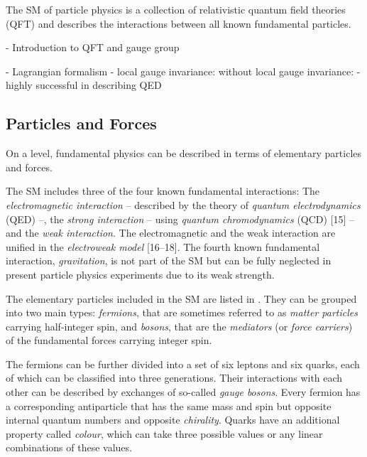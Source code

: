 

The SM of particle physics is a collection of relativistic quantum field theories (QFT) and describes the interactions between all known fundamental particles. 

- Introduction to QFT and gauge group

- Lagrangian formalism
- local gauge invariance: without local gauge invariance:
- highly successful in describing QED

\subsection{Particles and Forces}
\label{sec:particle-content}
On a  level, fundamental physics can be described in terms of elementary particles and forces. 

The SM includes three of the four known fundamental interactions: The \emph{electromagnetic interaction} -- described by the theory of \emph{quantum electrodynamics} (QED) --, the \emph{strong interaction} -- using \emph{quantum chromodynamics} (QCD) [15] -- and the \emph{weak interaction}. The electromagnetic and the weak interaction are unified in the \emph{electroweak model} [16–18]. The fourth known fundamental interaction, \emph{gravitation}, is not part of the SM but can be fully neglected in present particle physics experiments due to its weak strength.

The elementary particles included in the SM are listed in . They can be grouped into two main types: \emph{fermions}, that are sometimes referred to as \emph{matter particles} carrying half-integer spin, and \emph{bosons}, that are the \emph{mediators} (or \emph{force carriers}) of the fundamental forces carrying integer spin. 

The fermions can be further divided into a set of six leptons and six quarks, each of which can be classified into three generations. 
Their interactions with each other can be described by exchanges of so-called \emph{gauge bosons}. 
Every fermion has a corresponding antiparticle that has the same mass and spin but opposite internal quantum numbers and opposite \emph{chirality}. 
Quarks have an additional property called \emph{colour}, which can take three possible values or any linear combinations of these values.

